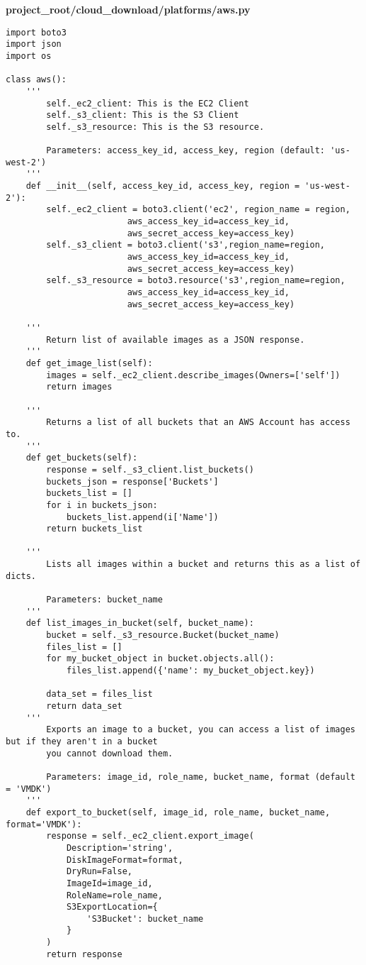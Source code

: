 \documentclass{article}
\begin{document}
\newpage
\textbf{project\_root/cloud\_download/platforms/aws.py}
\begin{verbatim}
import boto3
import json
import os

class aws():
    '''
        self._ec2_client: This is the EC2 Client
        self._s3_client: This is the S3 Client
        self._s3_resource: This is the S3 resource.

        Parameters: access_key_id, access_key, region (default: 'us-west-2')
    '''
    def __init__(self, access_key_id, access_key, region = 'us-west-2'):
        self._ec2_client = boto3.client('ec2', region_name = region, 
                        aws_access_key_id=access_key_id,
                        aws_secret_access_key=access_key)
        self._s3_client = boto3.client('s3',region_name=region, 
                        aws_access_key_id=access_key_id,
                        aws_secret_access_key=access_key)
        self._s3_resource = boto3.resource('s3',region_name=region, 
                        aws_access_key_id=access_key_id,
                        aws_secret_access_key=access_key)

    '''
        Return list of available images as a JSON response.
    '''
    def get_image_list(self):
        images = self._ec2_client.describe_images(Owners=['self'])
        return images

    '''
        Returns a list of all buckets that an AWS Account has access to.
    '''
    def get_buckets(self):
        response = self._s3_client.list_buckets()
        buckets_json = response['Buckets']
        buckets_list = []
        for i in buckets_json:
            buckets_list.append(i['Name'])
        return buckets_list

    '''
        Lists all images within a bucket and returns this as a list of dicts. 

        Parameters: bucket_name
    '''
    def list_images_in_bucket(self, bucket_name):
        bucket = self._s3_resource.Bucket(bucket_name)
        files_list = []
        for my_bucket_object in bucket.objects.all():
            files_list.append({'name': my_bucket_object.key})

        data_set = files_list
        return data_set
    '''
        Exports an image to a bucket, you can access a list of images but if they aren't in a bucket
        you cannot download them.

        Parameters: image_id, role_name, bucket_name, format (default = 'VMDK')
    '''
    def export_to_bucket(self, image_id, role_name, bucket_name, format='VMDK'):
        response = self._ec2_client.export_image(
            Description='string',
            DiskImageFormat=format,
            DryRun=False,
            ImageId=image_id,
            RoleName=role_name,
            S3ExportLocation={
                'S3Bucket': bucket_name
            }
        )
        return response


\end{verbatim}
\end{document}
